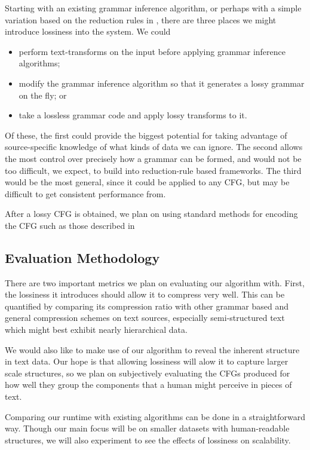 \documentclass[11pt]{article}
\begin{document}
Starting with an existing grammar inference algorithm, or perhaps with a simple
variation based on the reduction rules in \cite{grammarcodes}, there are three
places we might introduce lossiness into the system.  We could
\begin{itemize}
  \item perform text-transforms on the input before applying grammar
    inference algorithms;
  \item modify the grammar inference algorithm so that it generates a lossy
    grammar on the fly; or
  \item take a lossless grammar code and apply lossy transforms to it.
\end{itemize}
Of these, the first could provide the biggest potential for taking advantage of
source-specific knowledge of what kinds of data we can ignore.  The second
allows the most control over precisely how a grammar can be formed, and would
not be too difficult, we expect, to build into reduction-rule based frameworks.
The third would be the most general, since it could be applied to any CFG, but
may be difficult to get consistent performance from.

After a lossy CFG is obtained, we plan on using standard methods for encoding
the CFG such as those described in \cite{sequitur2}

\subsection{Evaluation Methodology}

There are two important metrics we plan on evaluating our algorithm with.
First, the lossiness it introduces should allow it to compress very well. This
can be quantified by comparing its compression ratio with other grammar based
and general compression schemes on text sources, especially semi-structured
text which might best exhibit nearly hierarchical data.

We would also like to make use of our algorithm to reveal the inherent
structure in text data. Our hope is that allowing lossiness will alow it to
capture larger scale structures, so we plan on subjectively evaluating the CFGs
produced for how well they group the components that a human might perceive in
pieces of text.

Comparing our runtime with existing algorithms can be done in a straightforward
way. Though our main focus will be on smaller datasets with human-readable
structures, we will also experiment to see the effects of lossiness on
scalability.
\end{document}
